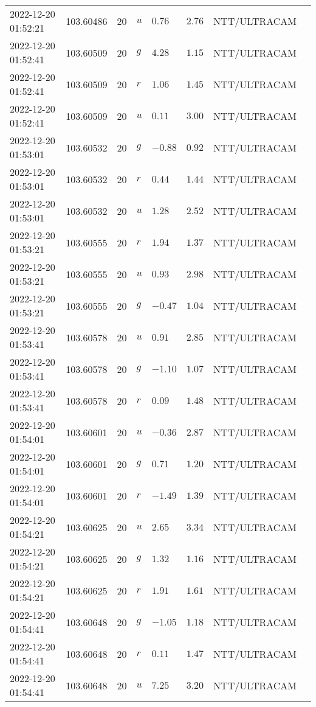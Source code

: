 \documentclass{nature_plusfigure}
\begin{document}
\begin{supplement}
\begin{center}
\begin{longtable}{llllllll}
2022-12-20 01:52:21 & 103.60486 & 20 & $u$ & $0.76$ & $2.76$ & NTT/ULTRACAM &  \\ 
2022-12-20 01:52:41 & 103.60509 & 20 & $g$ & $4.28$ & $1.15$ & NTT/ULTRACAM &  \\ 
2022-12-20 01:52:41 & 103.60509 & 20 & $r$ & $1.06$ & $1.45$ & NTT/ULTRACAM &  \\ 
2022-12-20 01:52:41 & 103.60509 & 20 & $u$ & $0.11$ & $3.00$ & NTT/ULTRACAM &  \\ 
2022-12-20 01:53:01 & 103.60532 & 20 & $g$ & $-0.88$ & $0.92$ & NTT/ULTRACAM &  \\ 
2022-12-20 01:53:01 & 103.60532 & 20 & $r$ & $0.44$ & $1.44$ & NTT/ULTRACAM &  \\ 
2022-12-20 01:53:01 & 103.60532 & 20 & $u$ & $1.28$ & $2.52$ & NTT/ULTRACAM &  \\ 
2022-12-20 01:53:21 & 103.60555 & 20 & $r$ & $1.94$ & $1.37$ & NTT/ULTRACAM &  \\ 
2022-12-20 01:53:21 & 103.60555 & 20 & $u$ & $0.93$ & $2.98$ & NTT/ULTRACAM &  \\ 
2022-12-20 01:53:21 & 103.60555 & 20 & $g$ & $-0.47$ & $1.04$ & NTT/ULTRACAM &  \\ 
2022-12-20 01:53:41 & 103.60578 & 20 & $u$ & $0.91$ & $2.85$ & NTT/ULTRACAM &  \\ 
2022-12-20 01:53:41 & 103.60578 & 20 & $g$ & $-1.10$ & $1.07$ & NTT/ULTRACAM &  \\ 
2022-12-20 01:53:41 & 103.60578 & 20 & $r$ & $0.09$ & $1.48$ & NTT/ULTRACAM &  \\ 
2022-12-20 01:54:01 & 103.60601 & 20 & $u$ & $-0.36$ & $2.87$ & NTT/ULTRACAM &  \\ 
2022-12-20 01:54:01 & 103.60601 & 20 & $g$ & $0.71$ & $1.20$ & NTT/ULTRACAM &  \\ 
2022-12-20 01:54:01 & 103.60601 & 20 & $r$ & $-1.49$ & $1.39$ & NTT/ULTRACAM &  \\ 
2022-12-20 01:54:21 & 103.60625 & 20 & $u$ & $2.65$ & $3.34$ & NTT/ULTRACAM &  \\ 
2022-12-20 01:54:21 & 103.60625 & 20 & $g$ & $1.32$ & $1.16$ & NTT/ULTRACAM &  \\ 
2022-12-20 01:54:21 & 103.60625 & 20 & $r$ & $1.91$ & $1.61$ & NTT/ULTRACAM &  \\ 
2022-12-20 01:54:41 & 103.60648 & 20 & $g$ & $-1.05$ & $1.18$ & NTT/ULTRACAM &  \\ 
2022-12-20 01:54:41 & 103.60648 & 20 & $r$ & $0.11$ & $1.47$ & NTT/ULTRACAM &  \\ 
2022-12-20 01:54:41 & 103.60648 & 20 & $u$ & $7.25$ & $3.20$ & NTT/ULTRACAM &  \\ 

\end{longtable}
\end{center}
\end{supplement}
\end{document}

